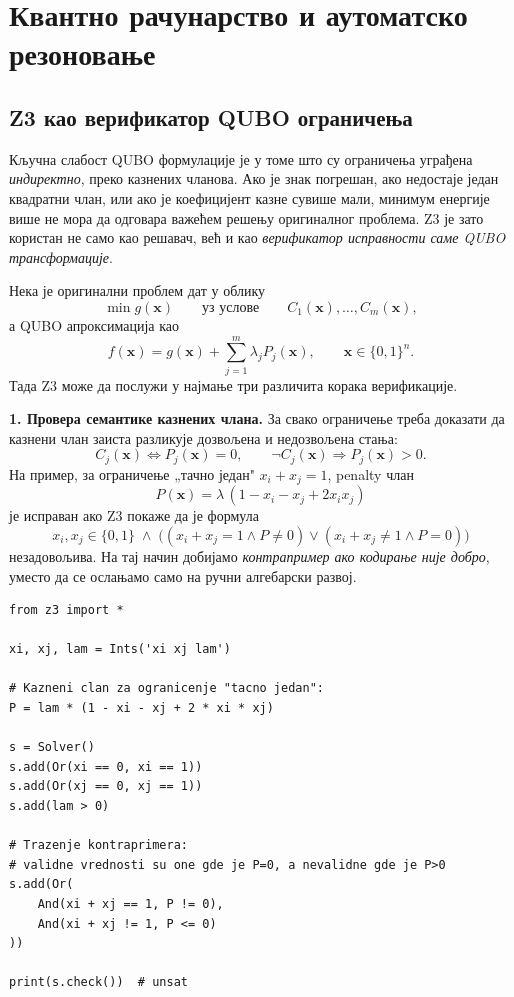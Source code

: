 \section{Квантно рачунарство и аутоматско резоновање}
\label{sec:ar}

\subsection{Z3 као верификатор QUBO ограничења}

Кључна слабост QUBO формулације је у томе што су ограничења
уграђена \emph{индиректно}, преко казнених чланова.
Ако је знак погрешан, ако недостаје један квадратни члан, или ако је
коефицијент казне сувише мали, минимум енергије више не мора да
одговара важећем решењу оригиналног проблема.
Z3 је зато користан не само као решавач, већ и као
\emph{верификатор исправности саме QUBO трансформације}.

Нека је оригинални проблем дат у облику
\[
  \min g(\mathbf{x})
  \qquad \text{уз услове} \qquad
  C_1(\mathbf{x}), \dots, C_m(\mathbf{x}),
\]
а QUBO апроксимација као
\[
  f(\mathbf{x}) = g(\mathbf{x}) + \sum_{j=1}^m \lambda_j P_j(\mathbf{x}),
  \qquad \mathbf{x} \in \{0,1\}^n.
\]
Тада Z3 може да послужи у најмање три различита корака верификације.

\textbf{1. Провера семантике казнених члана.}
За свако ограничење треба доказати да казнени члан заиста
разликује дозвољена и недозвољена стања:
\[
  C_j(\mathbf{x}) \iff P_j(\mathbf{x}) = 0,
  \qquad
  \neg C_j(\mathbf{x}) \Rightarrow P_j(\mathbf{x}) > 0.
\]
На пример, за ограничење „тачно један" $x_i + x_j = 1$,
penalty члан
\[
  P(\mathbf{x}) = \lambda\,(1 - x_i - x_j + 2x_ix_j)
\]
је исправан ако Z3 покаже да је формула
\[
  x_i,x_j \in \{0,1\}
  \;\land\;
  \bigl((x_i+x_j=1 \land P \neq 0)
  \lor
  (x_i+x_j\neq 1 \land P = 0)\bigr)
\]
незадовољива. На тај начин добијамо \emph{контрапример ако кодирање
није добро}, уместо да се ослањамо само на ручни алгебарски развој.

\begin{example}
\begin{lstlisting}[style=python, caption={Z3 проверава да казнени члан добро кодира ограничење $x_i + x_j = 1$.}]
from z3 import *

xi, xj, lam = Ints('xi xj lam')

# Kazneni clan za ogranicenje "tacno jedan":
P = lam * (1 - xi - xj + 2 * xi * xj)

s = Solver()
s.add(Or(xi == 0, xi == 1))
s.add(Or(xj == 0, xj == 1))
s.add(lam > 0)

# Trazenje kontraprimera:
# validne vrednosti su one gde je P=0, a nevalidne gde je P>0
s.add(Or(
    And(xi + xj == 1, P != 0),
    And(xi + xj != 1, P <= 0)
))

print(s.check())  # unsat
\end{lstlisting}
\end{example}

